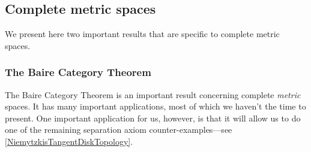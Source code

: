 \subsection{Complete metric spaces}

We present here two important results that are specific to complete metric spaces.

\subsubsection{The Baire Category Theorem}

The Baire Category Theorem is an important result concerning complete \emph{metric} spaces.  It has many important applications, most of which we haven't the time to present.  One important application for us, however, is that it will allow us to do one of the remaining separation axiom counter-examples---see \cref{NiemytzkisTangentDiskTopology}.
